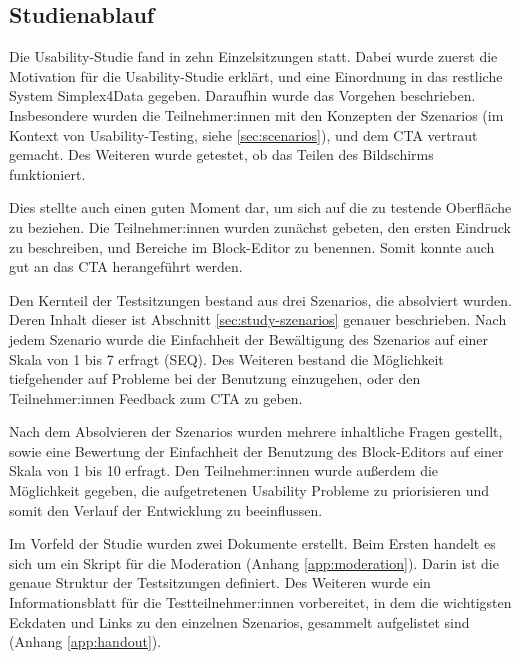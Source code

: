 \subsection{Studienablauf}

Die Usability-Studie fand in zehn Einzelsitzungen statt. Dabei wurde zuerst die Motivation für die Usability-Studie erklärt, und eine Einordnung in das restliche System Simplex4Data gegeben. Daraufhin wurde das Vorgehen beschrieben. Insbesondere wurden die Teilnehmer:innen mit den Konzepten der Szenarios (im Kontext von Usability-Testing, siehe \ref{sec:scenarios}), und dem \ac{CTA} vertraut gemacht. Des Weiteren wurde getestet, ob das Teilen des Bildschirms funktioniert.

Dies stellte auch einen guten Moment dar, um sich auf die zu testende Oberfläche zu beziehen. Die Teilnehmer:innen wurden zunächst gebeten, den ersten Eindruck zu beschreiben, und Bereiche im Block-Editor zu benennen. Somit konnte auch gut an das \ac{CTA} herangeführt werden.

Den Kernteil der Testsitzungen bestand aus drei Szenarios, die absolviert wurden. Deren Inhalt dieser ist Abschnitt \ref{sec:study-szenarios} genauer beschrieben. Nach jedem Szenario wurde die Einfachheit der Bewältigung des Szenarios auf einer Skala von 1 bis 7 erfragt (\ac{SEQ}). Des Weiteren bestand die Möglichkeit tiefgehender auf Probleme bei der Benutzung einzugehen, oder den Teilnehmer:innen Feedback zum \ac{CTA} zu geben.

Nach dem Absolvieren der Szenarios wurden mehrere inhaltliche Fragen gestellt, sowie eine Bewertung der Einfachheit der Benutzung des Block-Editors auf einer Skala von 1 bis 10 erfragt. Den Teilnehmer:innen wurde außerdem die Möglichkeit gegeben, die aufgetretenen Usability Probleme zu priorisieren und somit den Verlauf der Entwicklung zu beeinflussen.

Im Vorfeld der Studie wurden zwei Dokumente erstellt. Beim Ersten handelt es sich um ein Skript für die Moderation (Anhang \ref{app:moderation}). Darin ist die genaue Struktur der Testsitzungen definiert. Des Weiteren wurde ein Informationsblatt für die Testteilnehmer:innen vorbereitet, in dem die wichtigsten Eckdaten und Links zu den einzelnen Szenarios, gesammelt aufgelistet sind (Anhang \ref{app:handout}).
